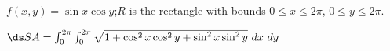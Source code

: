 {$f(x,y) = \sin x\cos y$;\quad $R$ is the rectangle with bounds $0\leq x\leq 2\pi$, \quad $0\leq y\leq2\pi$.

}
{$\ds SA = \int_0^{2\pi}\int_0^{2\pi} \sqrt{1+ \cos^2x\cos^2y+\sin^2x\sin^2y}\ dx\ dy$
}